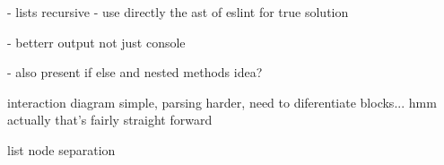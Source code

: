 - lists recursive
- use directly the ast of eslint for true solution

- betterr output not just console


- also present if else and nested methods idea? 

interaction diagram simple, parsing harder, need to diferentiate blocks... hmm actually that's fairly straight forward



list node separation